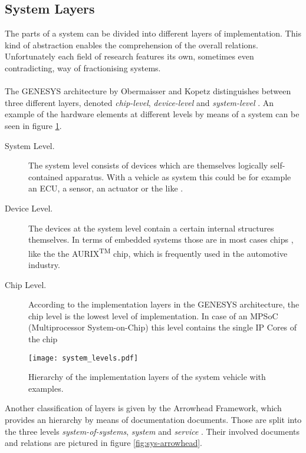 \subsection{System Layers}
\label{ch:system_layers}
The parts of a system can be divided into different layers of implementation. This kind of abstraction enables the comprehension of the overall relations. Unfortunately each field of research features its own, sometimes even contradicting, way of fractionising systems.
\\
\\
The GENESYS architecture by Obermaisser and Kopetz distinguishes between three different layers, denoted \emph{chip-level}, \emph{device-level} and \emph{system-level} \cite[p.44]{genesys}. An example of the hardware elements at different levels by means of a system can be seen in figure \ref{fig:integration_levels}.

\begin{description}
\item [System Level.]
The system level consists of devices which are themselves logically self-contained apparatus. With a vehicle as system this could be for example an ECU, a sensor, an actuator or the like \cite[p.45]{genesys}.
\item [Device Level.]
The devices at the system level contain a certain internal structures themselves. In terms of embedded systems those are in most cases chips \cite[p.45]{genesys}, like the the AURIX\textsuperscript{TM} chip, which is frequently used in the automotive industry.
\item [Chip Level.]
According to the implementation layers in the GENESYS architecture, the chip level is the lowest level of implementation. In case of an MPSoC (Multiprocessor System-on-Chip) this level contains the single IP Cores of the chip \cite[p.46]{genesys}
\end{description}

\begin{figure}[!htbp]
\centering
\texttt{[image: system\_levels.pdf]}
\caption{Hierarchy of the implementation layers of the system vehicle with examples.}
\label{fig:integration_levels}
\end{figure}

Another classification of layers is given by the Arrowhead Framework, which provides an hierarchy by means of documentation documents. Those are split into the three levels \emph{system-of-systems}, \emph{system} and \emph{service} \cite{arrowhead_inpr}. Their involved documents and relations are pictured in figure \ref{fig:sys-arrowhead}.

